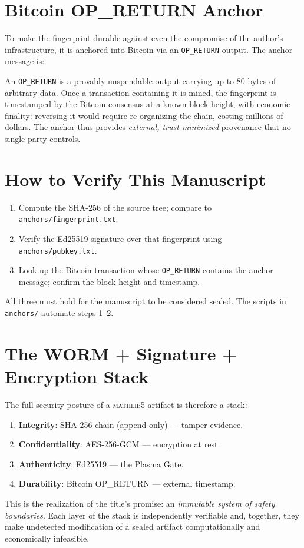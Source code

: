 \section{Bitcoin OP\_RETURN Anchor}
\label{sec:sec-btc}

To make the fingerprint durable against even the compromise of the author's
infrastructure, it is anchored into Bitcoin via an \texttt{OP\_RETURN}
output. The anchor message is:
\begin{center}
\ttfamily\footnotesize 
\end{center}
An \texttt{OP\_RETURN} is a provably-unspendable output carrying up to 80
bytes of arbitrary data. Once a transaction containing it is mined, the
fingerprint is timestamped by the Bitcoin consensus at a known block height,
with economic finality: reversing it would require re-organizing the chain,
costing millions of dollars. The anchor thus provides \emph{external,
trust-minimized} provenance that no single party controls.

\section{How to Verify This Manuscript}
\label{sec:sec-verify}

\begin{enumerate}
  \item Compute the SHA-256 of the source tree; compare to
        \texttt{anchors/fingerprint.txt}.
  \item Verify the Ed25519 signature over that fingerprint using
        \texttt{anchors/pubkey.txt}.
  \item Look up the Bitcoin transaction whose \texttt{OP\_RETURN} contains the
        anchor message; confirm the block height and timestamp.
\end{enumerate}
All three must hold for the manuscript to be considered sealed. The scripts
in \texttt{anchors/} automate steps 1--2.

\section{The WORM + Signature + Encryption Stack}
\label{sec:sec-stack}

The full security posture of a \textsc{mathlib5} artifact is therefore a stack:
\begin{enumerate}
  \item \textbf{Integrity}: SHA-256 chain (append-only) --- tamper evidence.
  \item \textbf{Confidentiality}: AES-256-GCM --- encryption at rest.
  \item \textbf{Authenticity}: Ed25519 --- the Plasma Gate.
  \item \textbf{Durability}: Bitcoin OP\_RETURN --- external timestamp.
\end{enumerate}
This is the realization of the title's promise: an \emph{immutable system of
safety boundaries}. Each layer of the stack is independently verifiable and,
together, they make undetected modification of a sealed artifact
computationally and economically infeasible.

